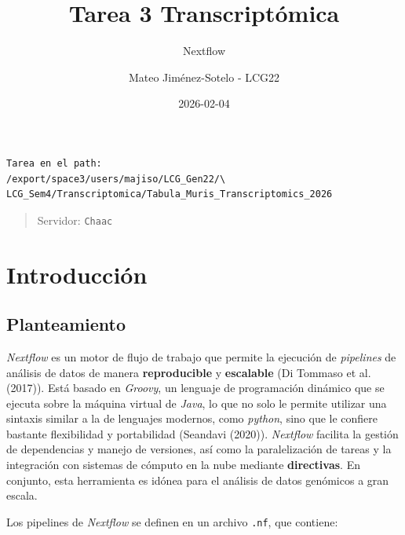 \documentclass[
  letterpaper,
  DIV=11,
  numbers=noendperiod]{scrartcl}
\title{Tarea 3 Transcriptómica}
\subtitle{Nextflow}
\author{Mateo Jiménez-Sotelo - LCG22}
\date{2026-02-04}
\begin{document}
\maketitle


\begin{verbatim}
Tarea en el path:
/export/space3/users/majiso/LCG_Gen22/\ 
LCG_Sem4/Transcriptomica/Tabula_Muris_Transcriptomics_2026
\end{verbatim}

\begin{quote}
Servidor: \texttt{Chaac}
\end{quote}

\section{Introducción}\label{introducciuxf3n}

\subsection{Planteamiento}\label{planteamiento}

\emph{Nextflow} es un motor de flujo de trabajo que permite la ejecución
de \emph{pipelines} de análisis de datos de manera \textbf{reproducible}
y \textbf{escalable} (Di Tommaso et al. (2017)). Está basado en
\emph{Groovy}, un lenguaje de programación dinámico que se ejecuta sobre
la máquina virtual de \emph{Java}, lo que no solo le permite utilizar
una sintaxis similar a la de lenguajes modernos, como \emph{python},
sino que le confiere bastante flexibilidad y portabilidad (Seandavi
(2020)). \emph{Nextflow} facilita la gestión de dependencias y manejo de
versiones, así como la paralelización de tareas y la integración con
sistemas de cómputo en la nube mediante \textbf{directivas}. En
conjunto, esta herramienta es idónea para el análisis de datos genómicos
a gran escala.

Los pipelines de \emph{Nextflow} se definen en un archivo \texttt{.nf},
que contiene:
\end{document}
